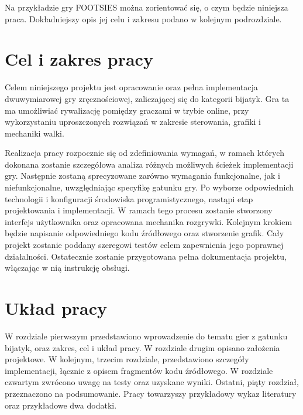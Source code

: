 Na przykładzie gry FOOTSIES można zorientować się, o czym będzie niniejsza praca. Dokładniejszy opis jej celu i zakresu podano w kolejnym podrozdziale.

\section{Cel i zakres pracy}
Celem niniejszego projektu jest opracowanie oraz pełna implementacja dwuwymiarowej gry zręcznościowej, zaliczającej się do kategorii bijatyk. Gra ta ma umożliwiać rywalizację pomiędzy graczami w trybie online, przy wykorzystaniu uproszczonych rozwiązań w zakresie sterowania, grafiki i mechaniki walki.

Realizacja pracy rozpocznie się od zdefiniowania wymagań, w ramach których dokonana zostanie szczegółowa analiza różnych możliwych ścieżek implementacji gry. Następnie zostaną sprecyzowane zarówno wymagania funkcjonalne, jak i niefunkcjonalne, uwzględniając specyfikę gatunku gry. Po wyborze odpowiednich technologii i konfiguracji środowiska programistycznego, nastąpi etap projektowania i implementacji. W ramach tego procesu zostanie stworzony interfejs użytkownika oraz opracowana mechanika rozgrywki. Kolejnym krokiem będzie napisanie odpowiedniego kodu źródłowego oraz stworzenie grafik. Cały projekt zostanie poddany szeregowi testów celem zapewnienia jego poprawnej działalności. Ostatecznie zostanie przygotowana pełna dokumentacja projektu, włączając w nią instrukcję obsługi.

\section{Układ pracy}
W rozdziale pierwszym przedstawiono wprowadzenie do tematu gier z gatunku bijatyk, oraz zakres, cel i układ pracy.
W rozdziale drugim opisano założenia projektowe.
W kolejnym, trzecim rozdziale, przedstawiono szczegóły implementacji, łącznie z opisem fragmentów kodu źródłowego.
W rozdziale czwartym zwrócono uwagę na testy oraz uzyskane wyniki.
Ostatni, piąty rozdział, przeznaczono na podsumowanie.
Pracy towarzyszy przykładowy wykaz literatury oraz przykładowe dwa dodatki. 

